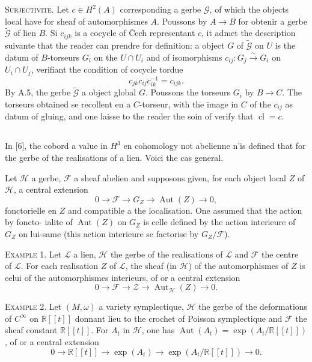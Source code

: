 \documentclass[11pt,a4paper]{article}
\theoremstyle{plain}
\theoremstyle{definition}
\DeclareMathOperator{\Aut}{Aut}
\DeclareMathOperator{\cl}{cl}
\newcommand{\R}{\mathbb{R}}
\newcommand{\iso}{\xrightarrow{\sim}}
\begin{document}
\noindent \textsc{Surjectivite.} Let $c \in H^{2}(A)$ corresponding a gerbe $\mathcal{G}$, of which the objects
local have for sheaf of automorphismes $A$. Poussons by $A \to B$ for obtenir
a gerbe $\widetilde{\mathcal{G}}$ of lien $B$. Si $c_{ijk}$ is a cocycle of \v{C}ech representant $c$, it admet the
description suivante that the reader can prendre for definition: a object $G$ of $\widetilde{\mathcal{G}}$ on
$U$ is the datum of $B$-torseurs $G_{i}$ on the $U \cap U_{i}$ and of isomorphisms $c_{ij}: G_{j} \iso G_{i}$
on $U_{i} \cap U_{j}$, verifiant the condition of cocycle tordue
\[
c_{jk} c_{ij} c_{ik}^{-1} = c_{ijk}.
\]
By A.5, the gerbe $\widetilde{\mathcal{G}}$ a object global $G$. Poussons the torseurs $G_{i}$ by $B \to C$.
The torseurs obtained se recollent en a $C$-torseur, with the image in $C$ of the
$c_{ij}$ as datum of gluing, and one laisse to the reader the soin of verify that $\cl = c$.

\subsection{}
In [6], the cobord a value in $H^{3}$ en cohomology not abelienne n'is defined
that for the gerbe of the realisations of a lien. Voici the cas general.

Let $\mathcal{H}$ a gerbe, $\mathcal{F}$ a sheaf abelien and supposons given, for each
object local $Z$ of $\mathcal{H}$, a central extension
\begin{equation}
0 \longrightarrow \mathcal{F} \longrightarrow G_{Z} \longrightarrow \Aut(Z) \longrightarrow 0, \tag{A.6.1}
\end{equation}
fonctorielle en $Z$ and compatible a the localisation. One assumed that the action by foncto-
ialite of $\Aut(Z)$ on $G_{Z}$ is celle defined by the action interieure of $G_{Z}$ on lui-same
(this action interieure se factorise by $G_{Z}/\mathcal{F}$).

\noindent \textsc{Example 1.} Let $\mathcal{L}$ a lien, $\mathcal{H}$ the gerbe of the realisations of $\mathcal{L}$ and $\mathcal{F}$ the centre of $\mathcal{L}$.
For each realisation $Z$ of $\mathcal{L}$, the sheaf (in $\mathcal{H}$) of the automorphismes of $Z$ is
celui of the automorphismes interieurs, of or a central extension
\[
0 \longrightarrow \mathcal{F} \longrightarrow \mathcal{Z} \longrightarrow \Aut_{\mathcal{H}}(Z) \longrightarrow 0.
\]

\noindent \textsc{Example 2.} Let $(M, \omega)$ a variety symplectique, $\mathcal{H}$ the gerbe of the deformations of $C^{\infty}$ on $\R[[t]]$ donnant lieu to the crochet of Poisson symplectique and $\mathcal{F}$ the sheaf constant $\R[[t]]$. For $A_{t}$ in $\mathcal{H}$, one has $\Aut(A_{t}) = \exp(A_{t}/\R[[t]])$, of or a central extension
\[
0 \longrightarrow \R[[t]] \longrightarrow \exp(A_{t}) \longrightarrow \exp(A_{t}/\R[[t]]) \longrightarrow 0.
\]
\end{document}
